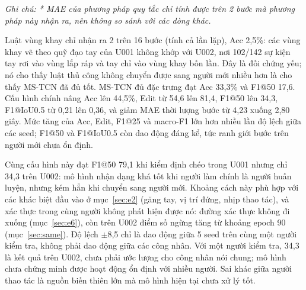 \begin{table}[H]
\centering
\caption{Kết quả trên người kiểm tra U002 (trung bình $\pm$ độ lệch chuẩn qua 5 seed)}\label{tab:e1}
\scriptsize
\setlength{\tabcolsep}{3pt}\renewcommand{\arraystretch}{1.25}
\end{table}

{\small\itshape Ghi chú: * MAE của phương pháp quy tắc chỉ tính được trên 2 bước mà phương pháp này nhận ra, nên không so sánh với các dòng khác.\par}

Luật vùng khay chỉ nhận ra 2 trên 16 bước (tính cả lần lặp), Acc 2,5\%: các vùng khay vẽ theo quỹ đạo tay của U001 không khớp với U002, nơi 102/142 sự kiện tay rơi vào vùng lắp ráp và tay chỉ vào vùng khay bốn lần. Đây là đối chứng yếu; nó cho thấy luật thủ công không chuyển được sang người mới nhiều hơn là cho thấy MS-TCN đã đủ tốt. MS-TCN đủ đặc trưng đạt Acc 33,3\% và F1@50 17,6. Cấu hình chính nâng Acc lên 44,5\%, Edit từ 54,6 lên 81,4, F1@50 lên 34,3, F1@IoU0.5 từ 0,21 lên 0,36, và giảm MAE thời lượng bước từ 4,23 xuống 2,80 giây. Mức tăng của Acc, Edit, F1@25 và macro-F1 lớn hơn nhiều lần độ lệch giữa các seed; F1@50 và F1@IoU0.5 còn dao động đáng kể, tức ranh giới bước trên người mới chưa ổn định.

Cùng cấu hình này đạt F1@50 79,1 khi kiểm định chéo trong U001 nhưng chỉ 34,3 trên U002: mô hình nhận dạng khá tốt khi người làm chính là người huấn luyện, nhưng kém hẳn khi chuyển sang người mới. Khoảng cách này phù hợp với các khác biệt đầu vào ở mục~\ref{sec:e2} (găng tay, vị trí đứng, nhịp thao tác), và xác thực trong cùng người không phát hiện được nó: đường xác thực không đi xuống (mục~\ref{sec:e6}), còn trên U002 điểm số ngừng tăng từ khoảng epoch 90 (mục~\ref{sec:same}). Độ lệch $\pm$8,5 chỉ là dao động giữa 5 seed trên cùng một người kiểm tra, không phải dao động giữa các công nhân. Với một người kiểm tra, 34,3 là kết quả trên U002, chưa phải ước lượng cho công nhân nói chung; mô hình chưa chứng minh được hoạt động ổn định với nhiều người. Sai khác giữa người thao tác là nguồn biến thiên lớn mà mô hình hiện tại chưa xử lý tốt.

